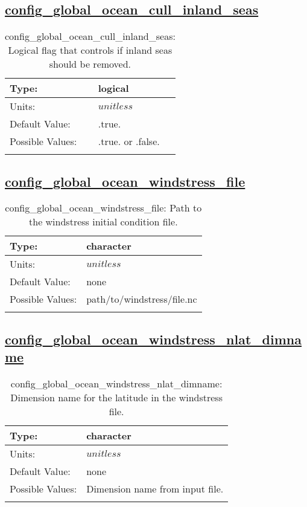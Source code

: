 \subsection[config\_global\_ocean\_cull\_inland\_seas]{\hyperref[sec:nm_tab_global_ocean]{config\_global\_ocean\_cull\_inland\_seas}}
\label{subsec:nm_sec_config_global_ocean_cull_inland_seas}
\begin{center}
\begin{longtable}{| p{2.0in} || p{4.0in} |}
    \hline
    Type: & logical \\
    \hline
    Units: & $unitless$ \\
    \hline
    Default Value: & .true. \\
    \hline
    Possible Values: & .true. or .false. \\
    \hline
    \caption{config\_global\_ocean\_cull\_inland\_seas: Logical flag that controls if inland seas should be removed.}
\end{longtable}
\end{center}
\subsection[config\_global\_ocean\_windstress\_file]{\hyperref[sec:nm_tab_global_ocean]{config\_global\_ocean\_windstress\_file}}
\label{subsec:nm_sec_config_global_ocean_windstress_file}
\begin{center}
\begin{longtable}{| p{2.0in} || p{4.0in} |}
    \hline
    Type: & character \\
    \hline
    Units: & $unitless$ \\
    \hline
    Default Value: & none \\
    \hline
    Possible Values: & path/to/windstress/file.nc \\
    \hline
    \caption{config\_global\_ocean\_windstress\_file: Path to the windstress initial condition file.}
\end{longtable}
\end{center}
\subsection[config\_global\_ocean\_windstress\_nlat\_dimname]{\hyperref[sec:nm_tab_global_ocean]{config\_global\_ocean\_windstress\_nlat\_dimname}}
\label{subsec:nm_sec_config_global_ocean_windstress_nlat_dimname}
\begin{center}
\begin{longtable}{| p{2.0in} || p{4.0in} |}
    \hline
    Type: & character \\
    \hline
    Units: & $unitless$ \\
    \hline
    Default Value: & none \\
    \hline
    Possible Values: & Dimension name from input file. \\
    \hline
    \caption{config\_global\_ocean\_windstress\_nlat\_dimname: Dimension name for the latitude in the windstress file.}
\end{longtable}
\end{center}
